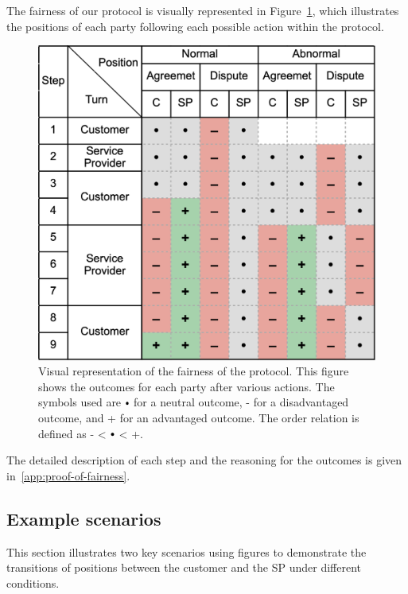 \documentclass[pdftex,twocolumn,epjc3]{svjour3}
\newcommand{\plus}{+}
\newcommand{\minus}{-}
\newcommand\neutral[1][.75]{\mathbin{\ThisStyle{\vcenter{\hbox{%
  \scalebox{#1}{$\SavedStyle\bullet$}}}}}%
}
\begin{document}
{The fairness of our protocol is visually represented in Figure~\ref{fig:positions}, which illustrates the positions of each party following each possible action within the protocol.

\begin{figure}[h!]
\includegraphics[width=\linewidth]{model.png}
\centering
\caption{Visual representation of the fairness of the protocol. This figure shows the outcomes for each party after various actions. The symbols used are $\neutral{}$ for a neutral outcome, \minus{} for a disadvantaged outcome, and \plus{} for an advantaged outcome. The order relation is defined as \minus{} < $\neutral{}$ < \plus{}.}
\label{fig:positions}
\end{figure}

The detailed description of each step and the reasoning for the outcomes is given in~\ref{app:proof-of-fairness}.

\subsection{Example scenarios}\label{example-scenarios}
This section illustrates two key scenarios using figures to demonstrate the transitions of positions between the customer and the SP under different conditions.

}
\end{document}

